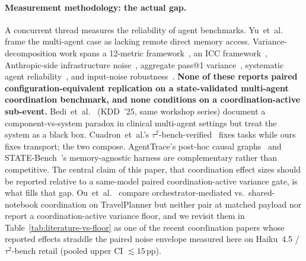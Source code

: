 \paragraph{Measurement methodology: the actual gap.}
A concurrent thread measures the reliability of agent
benchmarks. Yu~et~al.~\cite{multiagentmem2026} frame the
multi-agent case as lacking remote direct memory access.
Variance-decomposition work spans a 12-metric
framework~\cite{rabanser2026reliability}, an ICC
framework~\cite{mustahsan2025stochasticity}, Anthropic-side
infrastructure noise~\cite{anthropicnoise2026}, aggregate
pass@1 variance~\cite{randomnessagentic2026}, systematic
agent reliability~\cite{reliabilitybench2026}, and input-noise
robustness~\cite{agentnoisebench2026}.
\textbf{None of these reports paired configuration-equivalent
replication on a state-validated multi-agent coordination
benchmark, and none conditions on a coordination-active
sub-event.} Bedi~et~al.~\cite{bedi2025paradox} (KDD~'25,
same workshop series) document a component-vs-system paradox
in clinical multi-agent settings but treat the system as a
black box. Cuadron~et~al.'s
$\tau^2$-bench-verified~\cite{tau2bench_verified2025} fixes
tasks while ours fixes transport; the two compose. AgentTrace's
post-hoc causal graphs~\cite{agenttrace2026} and
STATE-Bench~\cite{statebench2026}'s memory-agnostic harness
are complementary rather than competitive.
The central claim of this paper, that coordination effect
sizes should be reported relative to a same-model paired
coordination-active variance gate, is what fills that gap.
Ou~et~al.~\cite{ou2025coordination} compare
orchestrator-mediated vs.\ shared-notebook coordination on
TravelPlanner but neither pair at matched payload nor report
a coordination-active variance floor, and we revisit them in
Table~\ref{tab:literature-vs-floor} as one of the recent
coordination papers whose reported effects straddle the paired
noise envelope measured here on Haiku~4.5 / $\tau^2$-bench
retail (pooled upper CI $\lesssim 15$\,pp).
